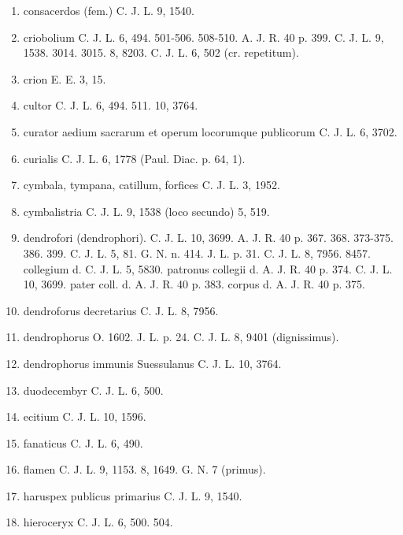 \documentclass[a4paper, 11pt, oneside, polutonikogreek, german, twocolumn]{article}
\begin{document}
\begin{enumerate}
\item consacerdos (fem.) C. J. L. 9, 1540.

\item criobolium C. J. L. 6, 494. 501-506. 508-510. A. J. R. 40 p. 399. C. J. L. 9, 1538. 3014. 3015. 8, 8203. C. J. L. 6, 502 (cr. repetitum).

\item crion E. E. 3, 15.

\item cultor C. J. L. 6, 494. 511. 10, 3764.

\item curator aedium sacrarum et operum locorumque publicorum C. J. L. 6, 3702.

\item curialis C. J. L. 6, 1778 (Paul. Diac. p. 64, 1).

\item cymbala, tympana, catillum, forfices C. J. L. 3, 1952.

\item cymbalistria C. J. L. 9, 1538 (loco secundo) 5, 519.

\item dendrofori (dendrophori). C. J. L. 10, 3699. A. J. R. 40 p. 367. 368. 373-375. 386. 399. C. J. L. 5, 81. G. N. n. 414. J. L. p. 31. C. J. L. 8, 7956. 8457. collegium d. C. J. L. 5, 5830. patronus collegii d. A. J. R. 40 p. 374. C. J. L. 10, 3699. pater coll. d. A. J. R. 40 p. 383. corpus d. A. J. R. 40 p. 375.

\item dendroforus decretarius C. J. L. 8, 7956.

\item dendrophorus O. 1602. J. L. p. 24. C. J. L. 8, 9401 (dignissimus).

\item dendrophorus immunis Suessulanus C. J. L. 10, 3764.

\item duodecembyr C. J. L. 6, 500.

\item ecitium C. J. L. 10, 1596.

\item fanaticus C. J. L. 6, 490.

\item flamen C. J. L. 9, 1153. 8, 1649. G. N. 7 (primus).

\item haruspex publicus primarius C. J. L. 9, 1540.

\item hieroceryx C. J. L. 6, 500. 504.


\end{enumerate}
\end{document}

